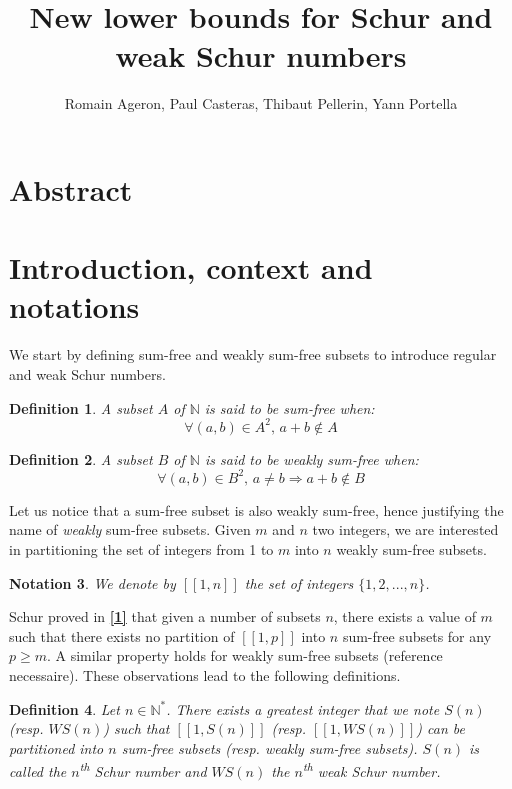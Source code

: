 \documentclass{article}
\title{New lower bounds for Schur and weak Schur numbers}
\author{Romain Ageron, Paul Casteras, Thibaut Pellerin, Yann Portella}
\newtheorem{definition}{Definition}[section]
\newtheorem{notation}[definition]{Notation}
\newtheorem{computational theorem}{Computational Theorem}[theorem]
\begin{document}
\maketitle

\section{Abstract}



\section{Introduction, context and notations}

We start by defining sum-free and weakly sum-free subsets to introduce regular and weak Schur numbers.

\begin{definition}
A subset \(A\) of \(\mathbb{N}\) is said to be \textit{sum-free} when:
\[ \forall (a,b) \in A^2 \text{, } a+b \notin A\]
\end{definition}

\begin{definition}
A subset \(B\) of \(\mathbb{N}\) is said to be \textit{weakly sum-free} when:
\[ \forall (a,b) \in B^2 \text{, } a \neq b \Longrightarrow a+b \notin B\]
\end{definition}

Let us notice that a sum-free subset is also weakly sum-free, hence justifying the name of \textit{weakly} sum-free
subsets. Given \(m\) and \(n\) two integers, we are interested in partitioning the set of integers from 1 to \(m\) into
\(n\) weakly sum-free subsets.

\begin{notation}
We denote by \([\![1,n]\!]\) the set of integers \(\{1, 2, ..., n\}\).
\end{notation}

Schur proved in \hyperlink{label1}{\textbf{[1]}} that given a number of subsets \(n\), there exists a value of \(m\)
such that there exists no partition of \([\![1,p]\!]\) into \(n\) sum-free subsets for any \(p \geqslant m\). A similar
property holds for weakly sum-free subsets (reference necessaire). These observations lead to the following definitions.

\begin{definition}
Let \(n \in \mathbb{N}^*\). There exists a greatest integer that we note \(S(n)\) (\textit{resp. \(WS(n)\)}) such that
\([\![1,S(n)]\!]\) (resp. \([\![1,WS(n)]\!]\)) can be partitioned into \(n\) sum-free subsets (resp. weakly sum-free
subsets). \(S(n)\) is called the \textit{\(n\)\textsuperscript{th} Schur number} and \textit{\(WS(n)\) the \(n\)\textsuperscript{th} weak
Schur number}.
\end{definition}
\end{document}
